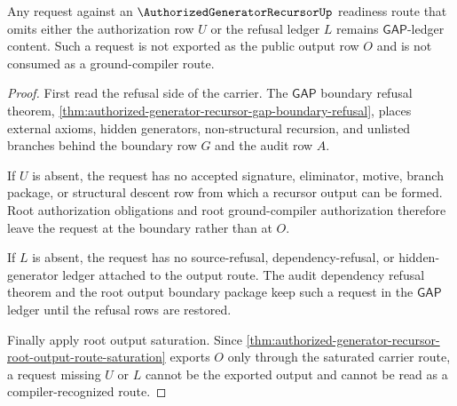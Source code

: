 \begin{theorem}
\label{thm:authorized-generator-recursor-output-refusal}
Any request against an $\AuthorizedGeneratorRecursorUp$ readiness route that
omits either the authorization row $U$ or the refusal ledger $L$ remains
$\mathsf{GAP}$-ledger content. Such a request is not exported as the public
output row $O$ and is not consumed as a ground-compiler route.
\end{theorem}
\begin{proof}
First read the refusal side of the carrier. The $\mathsf{GAP}$ boundary
refusal theorem, \autoref{thm:authorized-generator-recursor-gap-boundary-refusal},
places external axioms, hidden generators, non-structural recursion, and
unlisted branches behind the boundary row $G$ and the audit row $A$.

If $U$ is absent, the request has no accepted signature, eliminator, motive,
branch package, or structural descent row from which a recursor output can be
formed. Root authorization obligations and root ground-compiler authorization
therefore leave the request at the boundary rather than at $O$.

If $L$ is absent, the request has no source-refusal, dependency-refusal, or
hidden-generator ledger attached to the output route. The audit dependency
refusal theorem and the root output boundary package keep such a request in
the $\mathsf{GAP}$ ledger until the refusal rows are restored.

Finally apply root output saturation. Since
\autoref{thm:authorized-generator-recursor-root-output-route-saturation}
exports $O$ only through the saturated carrier route, a request missing $U$ or
$L$ cannot be the exported output and cannot be read as a compiler-recognized
route.
\end{proof}

